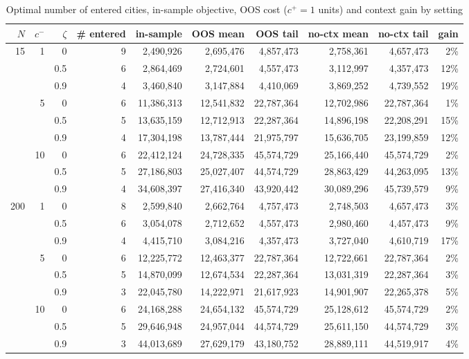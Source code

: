 \documentclass[10pt,a4paper]{article}
\begin{document}
\begin{table}[H]\centering\footnotesize
\caption{Optimal number of entered cities, in-sample objective, OOS cost ($c^+=1$ units) and context gain by setting}\label{tab:main}
\begin{tabular}{@{}rrr r rrr rr r@{}}
\toprule
$N$ & $c^-$ & $\zeta$ & \# entered & in-sample & OOS mean & OOS tail & no-ctx mean & no-ctx tail & gain \\ \midrule
15  & 1  & 0   & 9 & 2{,}490{,}926 & 2{,}695{,}476 & 4{,}857{,}473 & 2{,}758{,}361 & 4{,}657{,}473 & 2\% \\
    &    & 0.5 & 6 & 2{,}864{,}469 & 2{,}724{,}601 & 4{,}557{,}473 & 3{,}112{,}997 & 4{,}357{,}473 & 12\% \\
    &    & 0.9 & 4 & 3{,}460{,}840 & 3{,}147{,}884 & 4{,}410{,}069 & 3{,}869{,}252 & 4{,}739{,}552 & 19\% \\
    & 5  & 0   & 6 & 11{,}386{,}313 & 12{,}541{,}832 & 22{,}787{,}364 & 12{,}702{,}986 & 22{,}787{,}364 & 1\% \\
    &    & 0.5 & 5 & 13{,}635{,}159 & 12{,}712{,}913 & 22{,}287{,}364 & 14{,}896{,}198 & 22{,}208{,}291 & 15\% \\
    &    & 0.9 & 4 & 17{,}304{,}198 & 13{,}787{,}444 & 21{,}975{,}797 & 15{,}636{,}705 & 23{,}199{,}859 & 12\% \\
    & 10 & 0   & 6 & 22{,}412{,}124 & 24{,}728{,}335 & 45{,}574{,}729 & 25{,}166{,}440 & 45{,}574{,}729 & 2\% \\
    &    & 0.5 & 5 & 27{,}186{,}803 & 25{,}027{,}407 & 44{,}574{,}729 & 28{,}863{,}429 & 44{,}263{,}095 & 13\% \\
    &    & 0.9 & 4 & 34{,}608{,}397 & 27{,}416{,}340 & 43{,}920{,}442 & 30{,}089{,}296 & 45{,}739{,}579 & 9\% \\ \midrule
200 & 1  & 0   & 8 & 2{,}599{,}840 & 2{,}662{,}764 & 4{,}757{,}473 & 2{,}748{,}503 & 4{,}657{,}473 & 3\% \\
    &    & 0.5 & 6 & 3{,}054{,}078 & 2{,}712{,}652 & 4{,}557{,}473 & 2{,}980{,}460 & 4{,}457{,}473 & 9\% \\
    &    & 0.9 & 4 & 4{,}415{,}710 & 3{,}084{,}216 & 4{,}357{,}473 & 3{,}727{,}040 & 4{,}610{,}719 & 17\% \\
    & 5  & 0   & 6 & 12{,}225{,}772 & 12{,}463{,}377 & 22{,}787{,}364 & 12{,}722{,}661 & 22{,}787{,}364 & 2\% \\
    &    & 0.5 & 5 & 14{,}870{,}099 & 12{,}674{,}534 & 22{,}287{,}364 & 13{,}031{,}319 & 22{,}287{,}364 & 3\% \\
    &    & 0.9 & 3 & 22{,}045{,}780 & 14{,}222{,}971 & 21{,}617{,}923 & 14{,}901{,}907 & 22{,}265{,}378 & 5\% \\
    & 10 & 0   & 6 & 24{,}168{,}288 & 24{,}654{,}132 & 45{,}574{,}729 & 25{,}128{,}612 & 45{,}574{,}729 & 2\% \\
    &    & 0.5 & 5 & 29{,}646{,}948 & 24{,}957{,}044 & 44{,}574{,}729 & 25{,}611{,}150 & 44{,}574{,}729 & 3\% \\
    &    & 0.9 & 3 & 44{,}013{,}689 & 27{,}629{,}179 & 43{,}180{,}752 & 28{,}889{,}111 & 44{,}519{,}917 & 4\% \\
\bottomrule
\end{tabular}
\end{table}
\end{document}
